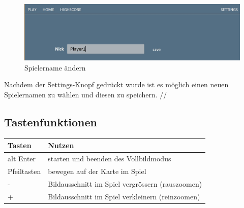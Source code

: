 \documentclass{scrartcl}
\begin{document}
\begin{figure}[H]
	\includegraphics[width=\linewidth]{settings.JPG}
	\caption{Spielername ändern}
	\label{fig:chaningName}
\end{figure}
Nachdem der Settings-Knopf gedrückt wurde ist es möglich einen neuen Spielernamen zu wählen und diesen zu speichern. //
\subsection{Tastenfunktionen}
\begin{center}
    \begin{tabular}{| p{6cm} | p{6cm} |}
        \hline
        \textbf{Tasten} & \textbf{Nutzen} \\ \hline
        alt Enter & starten und beenden des Vollbildmodus   \\ \hline
		Pfeiltasten & bewegen auf der Karte im Spiel\\ 
		\hline
       	- & Bildausschnitt im Spiel vergrössern (rauszoomen)\\ \hline
    	+ & Bildausschnitt im Spiel verkleinern (reinzoomen)\\ \hline
    \end{tabular}
\end{center}

\pagebreak
\end{document}

